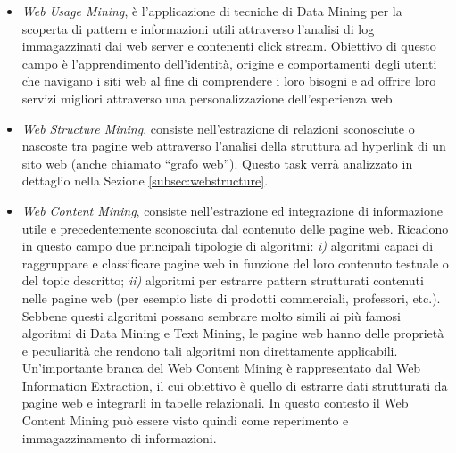 \begin{itemize}
\item \textit{Web Usage Mining}, è l’applicazione di tecniche di Data Mining per la scoperta di pattern e informazioni utili attraverso l'analisi di log immagazzinati dai web server e contenenti click stream. 
Obiettivo di questo campo è l'apprendimento dell'identità, origine e comportamenti degli utenti che navigano i siti web al fine di comprendere i loro bisogni e ad offrire loro servizi migliori attraverso una personalizzazione dell'esperienza web.
\item \textit{Web Structure Mining}, consiste nell'estrazione di relazioni sconosciute o nascoste tra pagine web attraverso l'analisi della struttura ad hyperlink di un sito web (anche chiamato ``grafo web''). Questo task verrà analizzato in dettaglio nella Sezione \ref{subsec:webstructure}.
\item \textit{Web Content Mining}, consiste nell'estrazione ed integrazione di informazione utile e precedentemente sconosciuta dal contenuto delle pagine web. Ricadono in questo campo due principali tipologie di algoritmi: \textit{i)} algoritmi capaci di raggruppare e classificare pagine web in funzione del loro contenuto testuale o del topic descritto; \textit{ii)} algoritmi per estrarre pattern strutturati contenuti nelle pagine web (per esempio liste di prodotti commerciali, professori, etc.).  
Sebbene questi algoritmi possano sembrare molto simili ai più famosi algoritmi di Data Mining e Text Mining, le pagine web hanno delle proprietà e peculiarità che rendono tali algoritmi non direttamente applicabili. Un'importante branca del Web Content Mining è rappresentato dal Web Information Extraction, il cui obiettivo è quello di estrarre dati strutturati da pagine web e integrarli in tabelle relazionali. In questo contesto il Web Content Mining può essere visto quindi come reperimento e immagazzinamento di informazioni.
\end{itemize}

